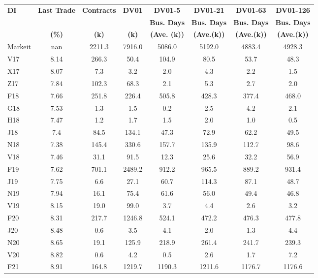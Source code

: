 \documentclass[article,crop=false]{standalone}%
\begin{document}
%
\normalsize%
\setlength{\tabcolsep}{0.15cm}%
\begin{tabular}[h]{l c c c c c c c}%
\hline%
\rowcolor{white}%
\textbf{DI}&\textbf{Last Trade}&\textbf{Contracts}&\textbf{DV01}&\textbf{DV01{-}5}&\textbf{DV01{-}21}&\textbf{DV01{-}63}&\textbf{DV01{-}126}\\%
\rowcolor{white}%
\textbf{}&\textbf{}&\textbf{}&\textbf{}&\textbf{Bus. Days}&\textbf{Bus. Days}&\textbf{Bus. Days}&\textbf{Bus. Days}\\%
\rowcolor{white}%
\textbf{}&\textbf{(\%)}&\textbf{(k)}&\textbf{(k)}&\textbf{(Ave. (k))}&\textbf{(Ave.(k))}&\textbf{(Ave.(k))}&\textbf{(Ave.(k))}\\%
\hline%
\rowcolor{lightgray}%
Markeit&nan&2211.3&7916.0&5086.0&5192.0&4883.4&4928.3\\%
\rowcolor{white}%
V17&8.14&266.3&50.4&104.9&80.5&53.7&48.3\\%
\rowcolor{lightgray}%
X17&8.07&7.3&3.2&2.0&4.3&2.2&1.5\\%
\rowcolor{white}%
Z17&7.84&102.3&68.3&2.1&5.3&2.7&2.0\\%
\rowcolor{lightgray}%
F18&7.66&251.8&226.4&505.8&428.3&377.4&468.0\\%
\rowcolor{white}%
G18&7.53&1.3&1.5&0.2&2.5&4.2&2.1\\%
\rowcolor{lightgray}%
H18&7.47&1.2&1.7&1.5&2.0&1.0&0.5\\%
\rowcolor{white}%
J18&7.4&84.5&134.1&47.3&72.9&62.2&49.5\\%
\rowcolor{lightgray}%
N18&7.38&145.4&330.6&157.7&135.9&112.7&98.6\\%
\rowcolor{white}%
V18&7.46&31.1&91.5&12.3&25.6&32.2&56.9\\%
\rowcolor{lightgray}%
F19&7.62&701.1&2489.2&912.2&965.5&889.2&931.4\\%
\rowcolor{white}%
J19&7.75&6.6&27.1&60.7&114.3&87.1&48.7\\%
\rowcolor{lightgray}%
N19&7.94&16.1&75.4&61.6&56.0&49.4&46.8\\%
\rowcolor{white}%
V19&8.15&19.0&99.0&3.7&4.4&2.6&3.2\\%
\rowcolor{lightgray}%
F20&8.31&217.7&1246.8&524.1&472.2&476.3&477.8\\%
\rowcolor{white}%
J20&8.48&0.6&3.5&4.1&2.0&1.3&4.4\\%
\rowcolor{lightgray}%
N20&8.65&19.1&125.9&218.9&261.4&241.7&239.3\\%
\rowcolor{white}%
V20&8.82&0.6&4.2&0.5&2.6&1.7&7.2\\%
\rowcolor{lightgray}%
F21&8.91&164.8&1219.7&1190.3&1211.6&1176.7&1176.6\\%

\end{tabular}
\end{document}
